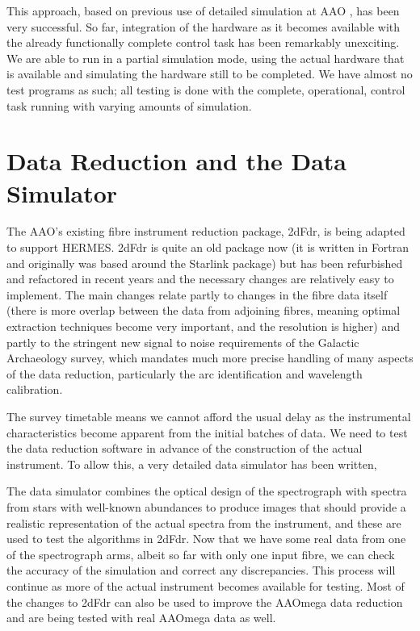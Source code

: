 This approach, based on previous use of detailed simulation at AAO \citep{TCS_2010}, has been very successful. So far, integration of the hardware as it becomes available with the already functionally complete control task has been remarkably unexciting. We are able to run in a partial simulation mode, using the actual hardware that is available and simulating the hardware still to be completed. We have almost no test programs as such; all testing is done with the complete, operational, control task running with varying amounts of simulation.

\section{Data Reduction and the Data Simulator}

The AAO's existing fibre instrument reduction package, 2dFdr, is being adapted to support HERMES. 2dFdr is quite an old package now (it is written in Fortran and originally was based around the Starlink package) but has been refurbished and refactored in recent years and the necessary changes are relatively easy to implement. The main changes relate partly to changes in the fibre data itself (there is more overlap between the data from adjoining fibres, meaning optimal extraction techniques become very important, and the resolution is higher) and partly to the stringent new signal to noise requirements of the Galactic Archaeology survey, which mandates much more precise handling of many aspects of the data reduction, particularly the arc identification and wavelength calibration.

The survey timetable means we cannot afford the usual delay as the instrumental characteristics become apparent from the initial batches of data. We need to test the data reduction software in advance of the construction of the actual instrument. To allow this, a very detailed data simulator has been written,

The data simulator combines the optical design of the spectrograph with spectra from stars with well-known abundances to produce images that should provide a realistic representation of the actual spectra from the instrument, and these are used to test the algorithms in 2dFdr. Now that we have some real data from one of the spectrograph arms, albeit so far with only one input fibre, we can check the accuracy of the simulation and correct any discrepancies. This process will continue as more of the actual instrument becomes available for testing. Most of the changes to 2dFdr can also be used to improve the AAOmega data reduction and are being tested with real AAOmega data as well.

